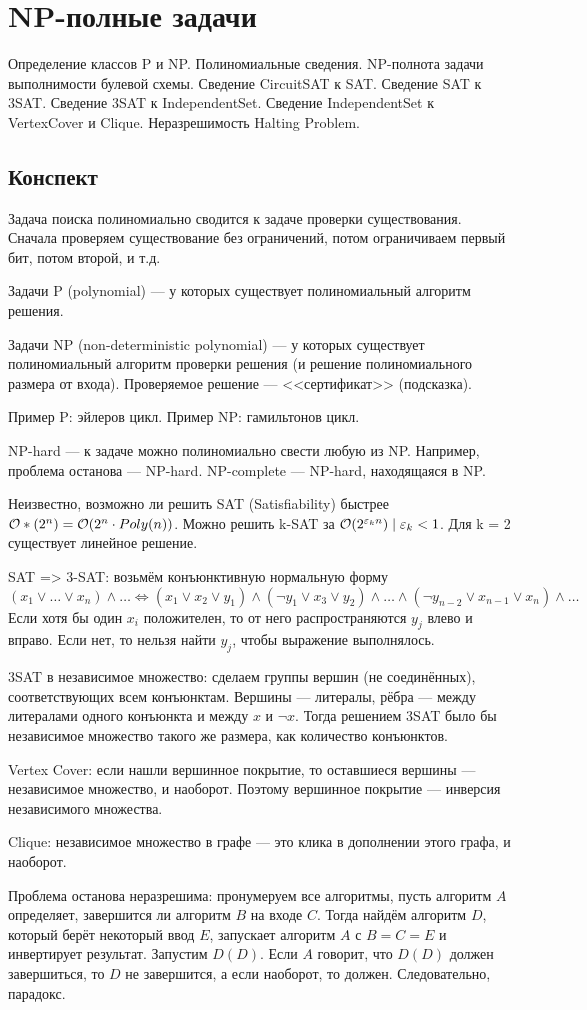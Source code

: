 \section{NP-полные задачи}
Определение классов P и NP.
Полиномиальные сведения.
NP-полнота задачи выполнимости булевой схемы.
Сведение CircuitSAT к SAT.
Сведение SAT к 3SAT.
Сведение 3SAT к IndependentSet.
Сведение IndependentSet к VertexCover и Clique.
Неразрешимость Halting Problem.

\subsection{Конспект}
Задача поиска полиномиально сводится к задаче проверки существования.
Сначала проверяем существование без ограничений,
потом ограничиваем первый бит,
потом второй, и т.д.

Задачи P (polynomial) --- у которых существует
полиномиальный алгоритм решения.

Задачи NP (non-deterministic polynomial) --- у которых существует
полиномиальный алгоритм проверки решения
(и решение полиномиального размера от входа).
Проверяемое решение --- <<сертификат>> (подсказка).

Пример P: эйлеров цикл.
Пример NP: гамильтонов цикл.

NP-hard --- к задаче можно полиномиально свести любую из NP.
Например, проблема останова --- NP-hard.
NP-complete --- NP-hard, находящаяся в NP.

Неизвестно, возможно ли решить
SAT (Satisfiability) быстрее $\mathcal{O}*(2^n) = \mathcal{O}(2^n \cdot Poly(n))$.
Можно решить k-SAT за $\mathcal{O}(2^{\varepsilon_k n}) \mid \varepsilon_k < 1$.
Для k = 2 существует линейное решение.

SAT => 3-SAT: возьмём конъюнктивную нормальную форму
\[
    (x_1 \lor \ldots \lor x_n) \land \ldots
    \Leftrightarrow
    (x_1 \lor x_2 \lor y_1) \land
    (\lnot y_1 \lor x_3 \lor y_2) \land \ldots \land
    (\lnot y_{n - 2} \lor x_{n - 1} \lor x_n) \land \ldots
\]
Если хотя бы один $x_i$ положителен,
то от него распространяются $y_j$ влево и вправо.
Если нет, то нельзя найти $y_j$, чтобы выражение выполнялось.

3SAT в независимое множество:
сделаем группы вершин (не соединённых),
соответствующих всем конъюнктам.
Вершины --- литералы,
рёбра --- между литералами одного конъюнкта
и между $x$ и $\lnot x$.
Тогда решением 3SAT было бы независимое множество
такого же размера, как количество конъюнктов.

Vertex Cover: если нашли вершинное покрытие,
то оставшиеся вершины --- независимое множество,
и наоборот.
Поэтому вершинное покрытие --- инверсия независимого множества.

Clique: независимое множество в графе
--- это клика в дополнении этого графа,
и наоборот.

Проблема останова неразрешима:
пронумеруем все алгоритмы,
пусть алгоритм $A$ определяет,
завершится ли алгоритм $B$ на входе $C$.
Тогда найдём алгоритм $D$,
который берёт некоторый ввод $E$,
запускает алгоритм $A$ с $B = C = E$
и инвертирует результат.
Запустим $D(D)$.
Если $A$ говорит, что $D(D)$ должен завершиться,
то $D$ не завершится, а если наоборот, то должен.
Следовательно, парадокс.
